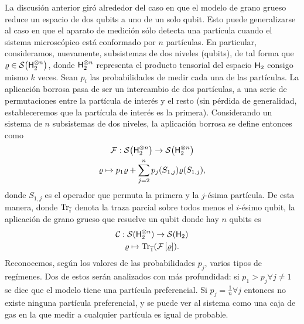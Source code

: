 
La discusión anterior giró alrededor del caso en que el modelo de grano grueso reduce un espacio de dos qubits a uno de un solo qubit. Esto puede generalizarse al caso en que el aparato de medición sólo detecta una partícula cuando el sistema microscópico está conformado por $n$ partículas. En particular, consideramos, nuevamente, subsistemas de dos niveles (qubits), de tal forma que $\varrho\in\mathcal{S}\qty( {\sf H}_{2}^{\otimes n})$, donde ${\sf H}_{2}^{\otimes n}$ representa el producto tensorial del espacio ${\sf H}_{2}$ consigo mismo $k$ veces. Sean $p_{i}$ las probabilidades de medir cada una de las partículas. La aplicación borrosa pasa de ser un intercambio de dos partículas, a una serie de permutaciones entre la partícula de interés y el resto (sin pérdida de generalidad, estableceremos que la partícula de interés es la primera). Considerando un sistema de $n$ subsistemas de dos niveles, la aplicación borrosa se define entonces como
\begin{gather}
    \mathcal{F}:\mathcal{S}\qty( {\sf H}_{2}^{\otimes n})\to \mathcal{S}\qty( {\sf H}_{2}^{\otimes n})\nonumber\\
    \varrho \mapsto p_{1}\varrho+\sum_{j=2}^{n}p_{j}(S_{1,j})\varrho(S_{1,j}),\nonumber
\end{gather}
donde $S_{1,j}$ es el operador que permuta la primera y la $j$-ésima partícula. De esta manera, donde $\Tr_{\overline{i}}$ denota la traza parcial sobre todos menos el $i$-ésimo qubit, la aplicación de grano grueso que resuelve un qubit donde hay $n$ qubits es
\begin{equation}\label{eq:CG}
    \begin{gathered}
        \mathcal{C}:\mathcal{S}( {\sf H}_{2}^{\otimes n})\to \mathcal{S}({\sf H}_{2})\\
        \varrho\mapsto\Tr_{\overline{1}}(\mathcal{F}\left[\varrho\right]).
    \end{gathered}
\end{equation}
Reconocemos, según los valores de las probabilidades $p_{j}$, varios tipos de regímenes. Dos de estos serán analizados con más profundidad: si $p_{1}>p_{j}\forall j\neq 1$ se dice que el modelo tiene una partícula preferencial. Si $p_{j}=\frac{1}{n}\forall j$ entonces no existe ninguna partícula preferencial, y se puede ver al sistema como una caja de gas en la que medir a cualquier partícula es igual de probable.